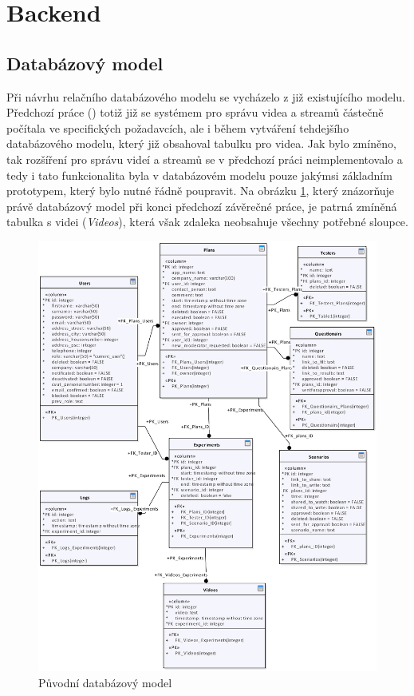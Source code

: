 \documentclass[thesis=M,czech]{FITthesis}[2012/06/26]
\begin{document}
\section{Backend} \label{sec:navrh_backend}
\subsection{Databázový model} \label{subsec:navrh_backend_databaze}
Při návrhu relačního databázového modelu se vycházelo z již existujícího modelu. Předchozí práce (\cite{solankar}) totiž již se systémem pro správu videa a streamů částečně počítala ve specifických požadavcích, ale i během vytváření tehdejšího databázového modelu, který již obsahoval tabulku pro videa. Jak bylo zmíněno, tak rozšíření pro správu videí a streamů se v předchozí práci neimplementovalo a tedy i tato funkcionalita byla v databázovém modelu pouze jakýmsi základním prototypem, který bylo nutné řádně poupravit. Na obrázku \ref{img:navrh_backend_db_orig}, který znázorňuje právě databázový model při konci předchozí závěrečné práce, je patrná zmíněná tabulka s videi (\textit{Videos}), která však zdaleka neobsahuje všechny potřebné sloupce.
\\
\begin{figure}[h]\centering
	\includegraphics[width=1\textwidth]{images/db_orig.eps}
	\caption{Původní databázový model}\label{img:navrh_backend_db_orig}
\end{figure}
\end{document}

